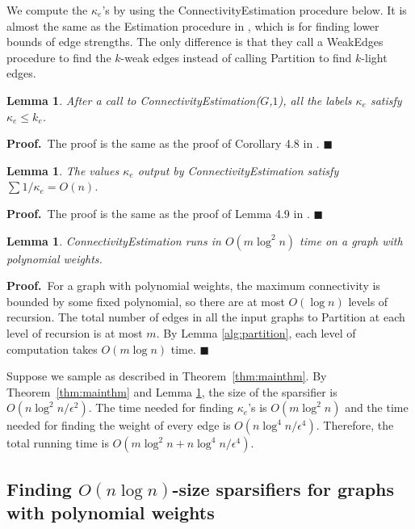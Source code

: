 \documentclass[11pt]{article}
\newcommand{\proofbelow}{8pt}
\numberwithin{equation}{section}
\newtheorem{lemma}[theorem]{Lemma}
\renewenvironment{proof}{\noindent\textbf{Proof.}\,}{\afterproof}
\newcommand{\afterproof}{\hfill $\blacksquare$ \par \vspace{\proofbelow}}
\newcommand{\Theorem}[1]{Theorem~\ref{thm:#1}}
\begin{document}
We compute the $\kappa_e$'s by using the ConnectivityEstimation procedure below.
It is almost the same as the Estimation procedure in \cite{BK},
which is for finding lower bounds of edge strengths.
The only difference is that they call a WeakEdges procedure
to find the $k$-weak edges
instead of calling Partition to find $k$-light edges.

\begin{lemma}
After a call to ConnectivityEstimation($G$,$1$),
all the labels $\kappa_e$ satisfy $\kappa_e\le k_e$.
\end{lemma}
\begin{proof}
The proof is the same as the proof of Corollary 4.8 in \cite{BK}.
\end{proof}

\begin{lemma}
\label{lem:sumKappa}
The values $\kappa_e$ output by ConnectivityEstimation satisfy $\sum 1/\kappa_e = O(n)$.
\end{lemma}
\begin{proof}
The proof is the same as the proof of Lemma 4.9 in \cite{BK}.
\end{proof} 

\begin{lemma}
ConnectivityEstimation runs in $O(m\log^2n)$ time on a graph with polynomial weights.
\end{lemma}
\begin{proof}
For a graph with polynomial weights, 
the maximum connectivity is bounded by some fixed polynomial,
so there are at most $O(\log n)$ levels of recursion.
The total number of edges in all the input graphs to Partition at each level of recursion
is at most $m$.
By Lemma \ref{alg:partition}, each level of computation takes $O(m\log n)$ time. 
\end{proof}

Suppose we sample as described in \Theorem{mainthm}.
By \Theorem{mainthm} and Lemma \ref{lem:sumKappa},
the size of the sparsifier is $O(n\log^2n/\epsilon^2)$.
The time needed for finding $\kappa_e$'s is $O(m\log^2n)$
and the time needed for finding the weight of every edge is $O(n\log^4n/\epsilon^4)$.
Therefore, the total running time is $O(m\log^2n+n\log^4n/\epsilon^4)$.


\subsection{Finding $O(n\log n)$-size sparsifiers for graphs with polynomial weights}
\end{document}
